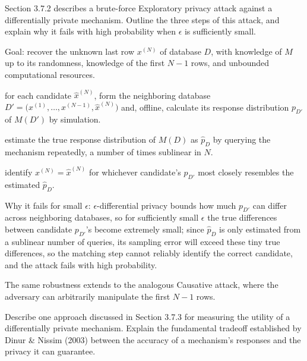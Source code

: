 \documentclass[10pt]{extarticle}
\newcommand{\resposta}[1]{\par\smallskip\noindent #1}
\begin{document}
\begin{questoes}
\item Section 3.7.2 describes a brute-force Exploratory privacy attack against a differentially private mechanism. Outline the three steps of this attack, and explain why it fails with high probability when $\epsilon$ is sufficiently small.

\resposta{
\begin{topicos}
\item Goal: recover the unknown last row $x^{(N)}$ of database $D$, with knowledge of $M$ up to its randomness, knowledge of the first $N-1$ rows, and unbounded computational resources.
\item[Step 1:] for each candidate $\hat{x}^{(N)}$, form the neighboring database $D' = \big(x^{(1)}, \ldots, x^{(N-1)}, \hat{x}^{(N)}\big)$ and, offline, calculate its response distribution $p_{D'}$ of $M(D')$ by simulation.
\item[Step 2:] estimate the true response distribution of $M(D)$ as $\hat{p}_D$ by querying the mechanism repeatedly, a number of times sublinear in $N$.
\item[Step 3:] identify $x^{(N)} = \hat{x}^{(N)}$ for whichever candidate's $p_{D'}$ most closely resembles the estimated $\hat{p}_D$.
\item Why it fails for small $\epsilon$: $\epsilon$-differential privacy bounds how much $p_{D'}$ can differ across neighboring databases, so for sufficiently small $\epsilon$ the true differences between candidate $p_{D'}$'s become extremely small; since $\hat{p}_D$ is only estimated from a sublinear number of queries, its sampling error will exceed these tiny true differences, so the matching step cannot reliably identify the correct candidate, and the attack fails with high probability.
\item The same robustness extends to the analogous Causative attack, where the adversary can arbitrarily manipulate the first $N-1$ rows.
\end{topicos}
}

\item Describe one approach discussed in Section 3.7.3 for measuring the utility of a differentially private mechanism. Explain the fundamental tradeoff established by Dinur \& Nissim (2003) between the accuracy of a mechanism's responses and the privacy it can guarantee.


\end{questoes}
\end{document}
